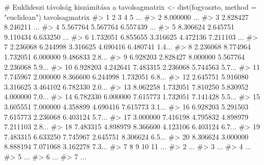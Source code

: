 \documentclass[
  letterpaper,
]{krantz}
\makeatletter
\newenvironment{Shaded}{\begin{snugshade}}{\end{snugshade}}
\newcommand{\AttributeTok}[1]{\textcolor[rgb]{0.40,0.45,0.13}{#1}}
\newcommand{\CommentTok}[1]{\textcolor[rgb]{0.37,0.37,0.37}{#1}}
\newcommand{\FunctionTok}[1]{\textcolor[rgb]{0.28,0.35,0.67}{#1}}
\newcommand{\NormalTok}[1]{\textcolor[rgb]{0.00,0.23,0.31}{#1}}
\newcommand{\OtherTok}[1]{\textcolor[rgb]{0.00,0.23,0.31}{#1}}
\newcommand{\StringTok}[1]{\textcolor[rgb]{0.13,0.47,0.30}{#1}}
\newenvironment{kframe}{%
\medskip{}
\setlength{\fboxsep}{.8em}
 \def\at@end@of@kframe{}%
 \ifinner\ifhmode%
  \def\at@end@of@kframe{\end{minipage}}%
  \begin{minipage}{\columnwidth}%
 \fi\fi%
 \def\FrameCommand##1{\hskip\@totalleftmargin \hskip-\fboxsep
 \colorbox{shadecolor}{##1}\hskip-\fboxsep
     \hskip-\linewidth \hskip-\@totalleftmargin \hskip\columnwidth}%
 \MakeFramed {\advance\hsize-\width
   \@totalleftmargin\z@ \linewidth\hsize
   \@setminipage}}%
 {\par\unskip\endMakeFramed%
 \at@end@of@kframe}
\renewenvironment{Shaded}{\begin{kframe}}{\end{kframe}}
\makeatother
\begin{document}
\begin{Shaded}
\begin{Highlighting}[]
\CommentTok{\# Euklideszi távolság kiszámítása a}
\NormalTok{tavolsagmatrix }\OtherTok{\textless{}{-}} \FunctionTok{dist}\NormalTok{(fogyaszto, }\AttributeTok{method =} \StringTok{"euclidean"}\NormalTok{)}
\NormalTok{tavolsagmatrix}
\CommentTok{\#\textgreater{}           1        2        3        4        5    ...}
\CommentTok{\#\textgreater{} 2  8.000000                                        ...}
\CommentTok{\#\textgreater{} 3  2.828427 8.246211                               ...}
\CommentTok{\#\textgreater{} 4  5.567764 5.567764 6.557439                      ...}
\CommentTok{\#\textgreater{} 5  8.306624 2.645751 9.110434 6.633250             ...}
\CommentTok{\#\textgreater{} 6  1.732051 6.855655 3.316625 4.472136 7.211103    ...}
\CommentTok{\#\textgreater{} 7  2.236068 6.244998 3.316625 4.690416 6.480741 1.4...}
\CommentTok{\#\textgreater{} 8  2.236068 8.774964 1.732051 6.000000 9.486833 2.8...}
\CommentTok{\#\textgreater{} 9  6.928203 2.828427 8.000000 5.567764 2.236068 5.9...}
\CommentTok{\#\textgreater{} 10 6.928203 4.242641 7.483315 2.236068 5.744563 5.7...}
\CommentTok{\#\textgreater{} 11 7.745967 2.000000 8.366600 6.244998 1.732051 6.8...}
\CommentTok{\#\textgreater{} 12 2.645751 5.916080 3.316625 3.464102 6.782330 2.0...}
\CommentTok{\#\textgreater{} 13 8.062258 1.732051 7.810250 5.830952 4.000000 7.0...}
\CommentTok{\#\textgreater{} 14 6.782330 6.000000 7.615773 1.732051 7.141428 5.5...}
\CommentTok{\#\textgreater{} 15 3.605551 7.000000 4.358899 4.690416 7.615773 3.1...}
\CommentTok{\#\textgreater{} 16 6.928203 5.291503 7.615773 2.236068 6.403124 5.7...}
\CommentTok{\#\textgreater{} 17 3.000000 7.416198 4.795832 4.898979 7.211103 2.8...}
\CommentTok{\#\textgreater{} 18 7.483315 4.898979 8.366600 4.123106 6.403124 6.7...}
\CommentTok{\#\textgreater{} 19 7.483315 6.633250 7.745967 2.645751 8.306624 6.5...}
\CommentTok{\#\textgreater{} 20 8.306624 3.000000 8.888194 7.071068 3.162278 7.3...}
\CommentTok{\#\textgreater{}           7        8        9       10       11    ...}
\CommentTok{\#\textgreater{} 2                                                  ...}
\CommentTok{\#\textgreater{} 3                                                  ...}
\CommentTok{\#\textgreater{} 4                                                  ...}
\CommentTok{\#\textgreater{} 5                                                  ...}
\CommentTok{\#\textgreater{} 6                                                  ...}
\CommentTok{\#\textgreater{} 7                                                  ...}

\end{Highlighting}
\end{Shaded}
\end{document}
